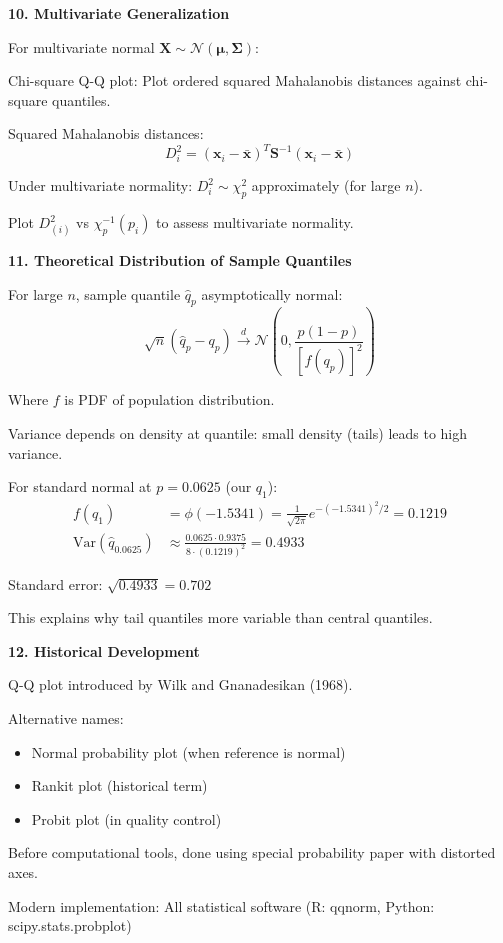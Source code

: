 \documentclass[12pt]{article}
\begin{document}
\begin{explanation}
\textbf{10. Multivariate Generalization}

For multivariate normal $\mathbf{X} \sim \mathcal{N}(\boldsymbol{\mu}, \boldsymbol{\Sigma})$:

Chi-square Q-Q plot: Plot ordered squared Mahalanobis distances against chi-square quantiles.

Squared Mahalanobis distances:
\[D_i^2 = (\mathbf{x}_i - \bar{\mathbf{x}})^T \mathbf{S}^{-1} (\mathbf{x}_i - \bar{\mathbf{x}})\]

Under multivariate normality: $D_i^2 \sim \chi_p^2$ approximately (for large $n$).

Plot $D_{(i)}^2$ vs $\chi_p^{-1}(p_i)$ to assess multivariate normality.

\textbf{11. Theoretical Distribution of Sample Quantiles}

For large $n$, sample quantile $\hat{q}_p$ asymptotically normal:
\[\sqrt{n}(\hat{q}_p - q_p) \xrightarrow{d} \mathcal{N}\left(0, \frac{p(1-p)}{[f(q_p)]^2}\right)\]

Where $f$ is PDF of population distribution.

Variance depends on density at quantile: small density (tails) leads to high variance.

For standard normal at $p = 0.0625$ (our $q_1$):
\begin{align*}
f(q_1) &= \phi(-1.5341) = \frac{1}{\sqrt{2\pi}} e^{-(-1.5341)^2/2} = 0.1219 \\
\text{Var}(\hat{q}_{0.0625}) &\approx \frac{0.0625 \cdot 0.9375}{8 \cdot (0.1219)^2} = 0.4933
\end{align*}

Standard error: $\sqrt{0.4933} = 0.702$

This explains why tail quantiles more variable than central quantiles.

\textbf{12. Historical Development}

Q-Q plot introduced by Wilk and Gnanadesikan (1968).

Alternative names:
\begin{itemize}
\item Normal probability plot (when reference is normal)
\item Rankit plot (historical term)
\item Probit plot (in quality control)
\end{itemize}

Before computational tools, done using special probability paper with distorted axes.

Modern implementation: All statistical software (R: qqnorm, Python: scipy.stats.probplot)

\end{explanation}
\end{document}
